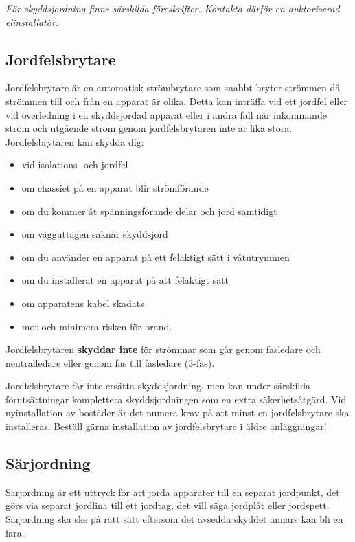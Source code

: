 \noindent\emph{För skyddsjordning finns särskilda föreskrifter.
  Kontakta därför en auktoriserad elinstallatör.}

\subsection{Jordfelsbrytare}

Jordfelsbrytare är en automatisk strömbrytare som snabbt bryter strömmen
då strömmen till och från en apparat är olika.
Detta kan inträffa vid ett jordfel eller vid överledning i en skyddsjordad
apparat eller i andra fall när inkommande ström och utgående ström genom
jordfelsbrytaren inte är lika stora.
Jordfelsbrytaren kan skydda dig:

\begin{itemize}
\item vid isolations- och jordfel
\item om chassiet på en apparat blir strömförande
\item om du kommer åt spänningsförande delar och jord samtidigt
\item om vägguttagen saknar skyddsjord
\item om du använder en apparat på ett felaktigt sätt i våtutrymmen
\item om du installerat en apparat på att felaktigt sätt
\item om apparatens kabel skadats
\item mot och minimera risken för brand.
\end{itemize}

Jordfelsbrytaren \textbf{skyddar inte} för strömmar som går genom fasledare
och neutralledare eller genom fas till fasledare (3-fas).

Jordfelsbrytare får inte ersätta skyddsjordning, men kan under särskilda
förutsättningar komplettera skyddsjordningen som en extra säkerhetsåtgärd.
Vid nyinstallation av bostäder är det numera krav på att minst en
jordfelsbrytare ska installeras.
Beställ gärna installation av jordfelsbrytare i äldre anläggningar!

\subsection{Särjordning}

Särjordning är ett uttryck för att jorda apparater till en separat jordpunkt,
det görs via separat jordlina till ett jordtag, det vill säga jordplåt eller
jordspett.
Särjordning ska ske på rätt sätt eftersom det avsedda skyddet annars kan bli en
fara.

